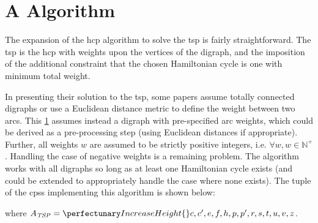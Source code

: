 \section{A   Algorithm}\label{sec:tsp:algotsp}

The expansion of the \gls{hcp} algorithm to solve the \gls{tsp} is fairly straightforward.  The \gls{tsp} is the \gls{hcp} with weights upon the vertices of the digraph, and the imposition of the additional constraint that the chosen Hamiltonian cycle is one with minimum total weight.  

In presenting their solution to the \gls{tsp}, some papers assume totally connected digraphs or use a Euclidean distance metric to define the weight between two arcs.  This \cref{sec:tsp:algotsp} assumes instead a digraph with pre-specified arc weights, which could be derived as a pre-processing step (using Euclidean distances if appropriate).   Further, all weights \(w\) are assumed to be strictly positive integers, i.e. \(\forall w, w \in \mathbb{N}^+\).  Handling the case of negative weights is a remaining problem.  The algorithm works with all digraphs so long as at least one Hamiltonian cycle exists (and could be extended to appropriately handle the case where none exists).  The tuple of the \glspl{cps} implementing this algorithm is shown below:

\noindent
where \(A_{\mathit{TSP}} = \cpset{c, c', e, f, h, p, p', r, s, t, u, v, z}\).

    
    
        
